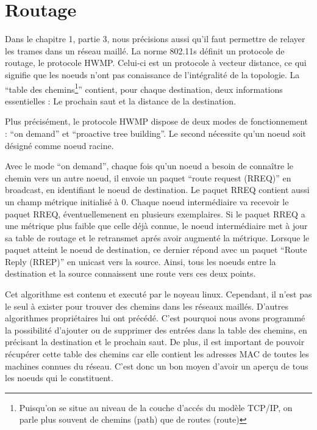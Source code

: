 \section{Routage}

Dans le chapitre 1, partie 3, nous précisions aussi qu'il faut permettre de relayer les trames dans un réseau maillé. La norme
802.11s définit un protocole de routage, le protocole HWMP. Celui-ci est un protocole à vecteur distance, ce qui signifie que les
noeuds n'ont pas conaissance de l'intégralité de la topologie. La ``table des chemins\footnote{Puisqu'on se situe au niveau de la 
couche d'accés du modèle TCP/IP, on parle plus souvent de chemins (path) que de routes (route)}'' contient, pour chaque destination,
deux informations essentielles : Le prochain saut et la distance de la destination.

Plus précisément, le protocole HWMP dispose de deux modes de fonctionnement : ``on demand'' et ``proactive tree building''. Le
second nécessite qu'un noeud soit désigné comme noeud racine\cite{MNroute}.

Avec le mode ``on demand'', chaque fois qu'un noeud a besoin de connaître le chemin vers un autre noeud, il envoie un paquet
``route request (RREQ)'' en broadcast, en identifiant le noeud de destination. Le paquet RREQ contient aussi un champ métrique
initialisé à 0. Chaque noeud intermédiaire va recevoir le paquet RREQ, éventuellemenent en plusieurs exemplaires. Si le paquet RREQ
a une métrique plus faible que celle déjà connue, le noeud intermédiaire met à jour sa table de routage et le retransmet aprés avoir 
augmenté la métrique. Lorsque le paquet atteint le noeud de destination, ce dernier répond avec un paquet ``Route Reply (RREP)''
en unicast vers la source. Ainsi, tous les noeuds entre la destination et la source connaissent une route vers ces deux points.

Cet algorithme est contenu et executé par le noyeau linux. Cependant, il n'est pas le seul à exister pour trouver des chemins dans 
les réseaux maillés. D'autres algorithmes propriétaires lui ont précédé. C'est pourquoi nous avons programmé la
possibilité d'ajouter ou de supprimer des entrées dans la table des chemins, en précisant la destination et le prochain saut. De plus,
il est important de pouvoir récupérer cette table des chemins car elle contient les adresses MAC de toutes les machines connues du 
réseau. C'est donc un bon moyen d'avoir un aperçu de tous les noeuds qui le constituent.